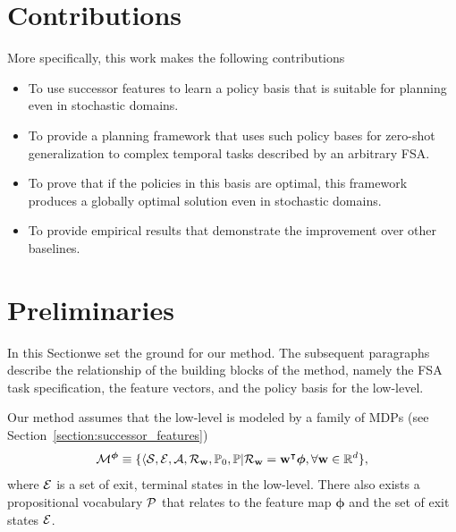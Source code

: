 \section{Contributions}
More specifically, this work makes the following contributions
 \begin{itemize}
    \item To use successor features to learn a policy basis that is suitable for planning even in stochastic domains.
    \item To provide a planning framework that uses such policy bases for zero-shot generalization to complex temporal tasks described by an arbitrary FSA.
    \item To prove that if the policies in this basis are optimal, this framework produces a globally optimal solution even in stochastic domains.
    \item To provide empirical results that demonstrate the improvement over other baselines.
\end{itemize}

\section{Preliminaries}

In this Sectionwe set the ground for our method. The subsequent paragraphs describe the relationship of the building blocks of the method, namely the FSA task specification, the feature vectors, and the policy basis for the low-level.

Our method assumes that the low-level is modeled by a family of MDPs (see Section~\ref{section:successor_features})
\begin{equation}
  \mathcal{M}^{\boldsymbol{\phi}}\equiv\{\langle\mathcal{S},\mathcal{E},\mathcal{A},\mathcal{R}_{\mathbf{w}},\mathbb{P}_0, \mathbb{P} \lvert \mathcal{R}_{\mathbf{w}} = \mathbf{w}^\intercal \boldsymbol{\phi}, \forall\mathbf{w}\in\mathbb{R}^d\},
\end{equation}
where $\mathcal{E}$ is a set of exit, terminal states in the low-level. There also exists a propositional vocabulary $\mathcal{P}$ that relates to the feature map $\boldsymbol{\phi}$ and the set of exit states $\mathcal{E}$. 


